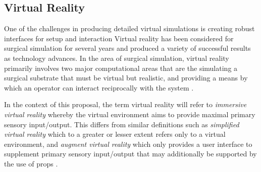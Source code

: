 
\subsection{Virtual Reality}

One of the challenges in producing detailed virtual simulations is creating robust interfaces for setup and interaction Virtual reality has been considered for surgical simulation for several years and produced a variety of successful results as technology advances. In the area of surgical simulation, virtual reality primarily involves two major computational areas that are the simulating a surgical substrate that must be virtual but realistic, and providing a means by which an operator can interact reciprocally with the system \cite{Wei2014}.

In the context of this proposal, the term virtual reality will refer to \textit{immersive virtual reality} whereby the virtual environment aims to provide maximal primary sensory input/output. This differs from similar definitions such as \textit{simplified virtual reality} which to a greater or lesser extent refers only to a virtual environment, and \textit{augment virtual reality} which only provides a user interface to supplement primary sensory input/output that may additionally be supported by the use of props \cite{Spicer2004}.
